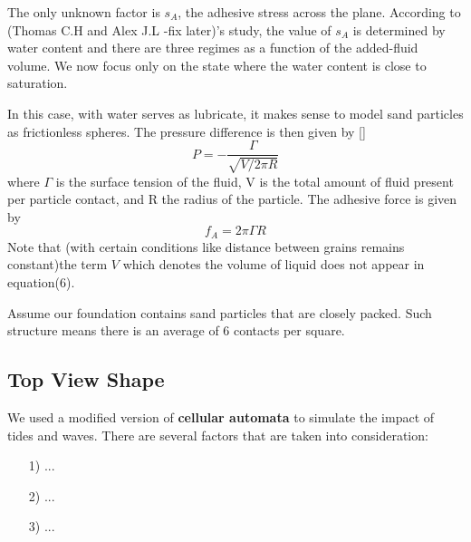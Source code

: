 \documentclass[12pt]{article}
\begin{document}
The only unknown factor is $s_A$, the adhesive stress across the plane. According to (Thomas C.H and Alex J.L -fix later)'s study, the value of $s_A$ is determined by water content and there are three regimes as a function of the added-fluid volume. We now focus only on the state where the water content is close to saturation. 
\par
In this case, with water serves as lubricate, it makes sense to model sand particles as frictionless spheres. The pressure difference is then given by [] 
$$P = -\frac{\Gamma}{\sqrt{V/2\pi R}}$$
where $\Gamma$ is the surface tension of the fluid, V is the total amount of fluid present per particle contact, and R the radius of the particle. The adhesive force is given by
$$f_A = 2\pi \Gamma R$$
Note that (with certain conditions like distance between grains remains constant)the term $V$ which denotes the volume of liquid does not appear in equation(6).
\par
Assume our foundation contains sand particles that are closely packed. Such structure means there is an average of 6 contacts per square.

\subsection{Top View Shape}
\par 
We used a modified version of\textbf{ cellular automata} to simulate the impact of tides and waves. There are several factors that are taken into consideration:
\par 
\begin{itemize}
	\item [1)] 
	...     
	\item [2)]
	...
	\item [3)]
	...
\end{itemize}
\end{document}
